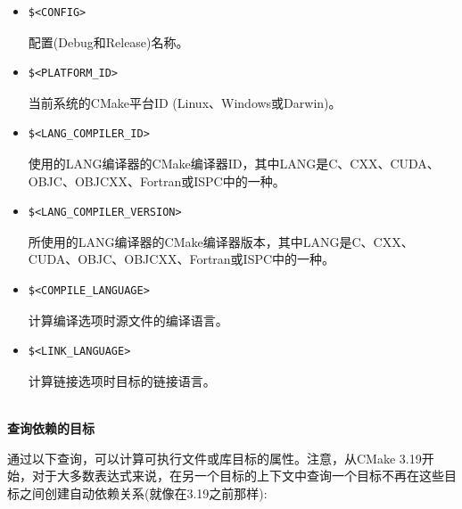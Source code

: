 \begin{itemize}
\item 
\begin{lstlisting}[style=styleCMake]
$<CONFIG> 
\end{lstlisting}

配置(Debug和Release)名称。

\item 
\begin{lstlisting}[style=styleCMake]
$<PLATFORM_ID>
\end{lstlisting}

当前系统的CMake平台ID (Linux、Windows或Darwin)。

\item 
\begin{lstlisting}[style=styleCMake]
$<LANG_COMPILER_ID> 
\end{lstlisting}

使用的LANG编译器的CMake编译器ID，其中LANG是C、CXX、CUDA、OBJC、OBJCXX、Fortran或ISPC中的一种。

\item 
\begin{lstlisting}[style=styleCMake]
$<LANG_COMPILER_VERSION> 
\end{lstlisting}

所使用的LANG编译器的CMake编译器版本，其中LANG是C、CXX、CUDA、OBJC、OBJCXX、Fortran或ISPC中的一种。

\item 
\begin{lstlisting}[style=styleCMake]
$<COMPILE_LANGUAGE>
\end{lstlisting}

计算编译选项时源文件的编译语言。

\item 
\begin{lstlisting}[style=styleCMake]
$<LINK_LANGUAGE>
\end{lstlisting}

计算链接选项时目标的链接语言。
\end{itemize}

\hspace*{\fill} \\ %
\noindent
\textbf{查询依赖的目标}

通过以下查询，可以计算可执行文件或库目标的属性。注意，从CMake 3.19开始，对于大多数表达式来说，在另一个目标的上下文中查询一个目标不再在这些目标之间创建自动依赖关系(就像在3.19之前那样):

